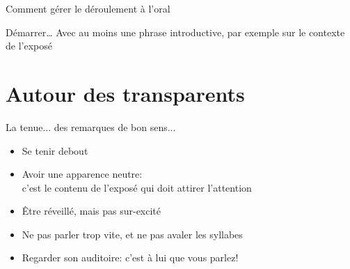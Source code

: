 \documentclass[12pt]{beamer}
\begin{document}

\begin{frame}{Comment gérer le déroulement à l'oral}
  \begin{block}{D\'emarrer\ldots}
    Avec au moins une phrase introductive, par exemple sur le contexte de l'exposé
  \end{block}



\end{frame}

\section{Autour des transparents}

\begin{frame}{La tenue... des remarques de bon sens...}
  \begin{itemize}
    \item Se tenir debout
    \item<2-> Avoir une apparence neutre: \\
    c'est le contenu de l'exposé qui doit attirer l'attention
    \item<3-> \^Etre réveillé, mais pas sur-excité
    \item<4-> Ne pas parler trop vite, et ne pas avaler les syllabes
    \item<5-> Regarder son auditoire: c'est \`a lui que vous parlez!
  \end{itemize}
\end{frame}

\end{document}
